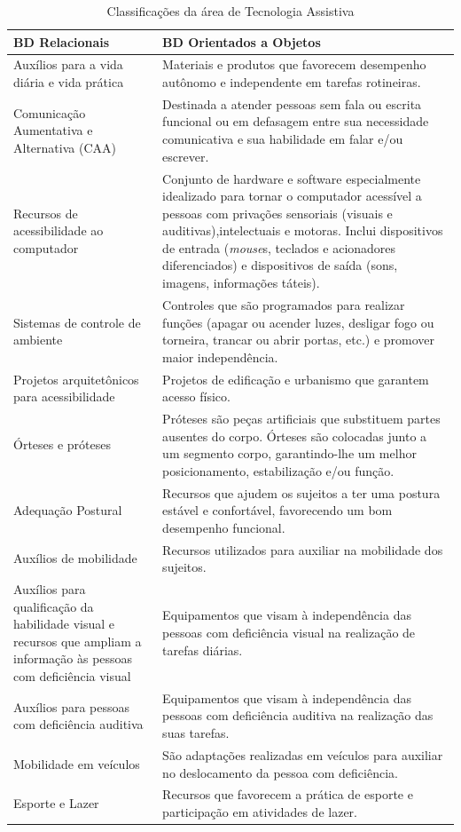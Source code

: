 \documentclass[
	12pt,			%
	openright,		%
	oneside,			%
	a4paper,			%
	chapter=TITLE,		%
	english,			%
	brazil,			%
	]{abntex2}
\begin{document}
\begin{table}[H]
\caption{Classificações da área de Tecnologia Assistiva}
\label{tab:tab-1}
{
\centering
\footnotesize
\begin{tabular}{|p{7cm}|p{7cm}|}
\hline
\textbf{BD Relacionais} & \textbf{BD Orientados a Objetos} \\
\hline
Auxílios para a vida diária e vida prática & Materiais e produtos que favorecem desempenho autônomo e independente em tarefas rotineiras.\\
\hline
Comunicação Aumentativa e Alternativa (CAA) & Destinada a atender pessoas sem fala ou escrita funcional ou em defasagem entre sua necessidade comunicativa e sua habilidade em falar e/ou escrever.\\
\hline
Recursos de acessibilidade ao computador & Conjunto de hardware e software especialmente idealizado para tornar o computador acessível a pessoas com privações sensoriais (visuais e auditivas),intelectuais e motoras. Inclui dispositivos de entrada (\emph{mouse}s, teclados e acionadores diferenciados) e dispositivos de saída (sons, imagens, informações táteis).\\
\hline
Sistemas de controle de ambiente & Controles que são programados para realizar funções (apagar ou acender luzes, desligar fogo ou torneira, trancar ou abrir portas, etc.) e promover maior independência.\\
\hline
Projetos arquitetônicos para acessibilidade & Projetos de edificação e urbanismo que garantem acesso físico.\\
\hline
Órteses e próteses & Próteses são peças artificiais que substituem partes ausentes do corpo. Órteses são colocadas junto a um segmento corpo, garantindo-lhe um melhor posicionamento, estabilização e/ou função.\\
\hline
Adequação Postural & Recursos que ajudem os sujeitos a ter uma postura estável e confortável, favorecendo um bom desempenho funcional.\\
\hline
Auxílios de mobilidade & Recursos utilizados para auxiliar na mobilidade dos sujeitos.\\
\hline
Auxílios para qualificação da habilidade visual e recursos que ampliam a informação às pessoas com deficiência visual & Equipamentos que visam à independência das pessoas com deficiência visual na realização de tarefas diárias.\\
\hline
Auxílios para pessoas com deficiência auditiva & Equipamentos que visam à independência das pessoas com deficiência auditiva na realização das suas tarefas.\\
\hline
Mobilidade em veículos & São adaptações realizadas em veículos para auxiliar no deslocamento da pessoa com deficiência.\\
\hline
Esporte e Lazer & Recursos que favorecem a prática de esporte e participação em atividades de lazer.\\
\hline
\end{tabular}
}
\end{table}
\end{document}
